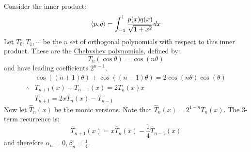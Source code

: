 \documentclass[../Main.tex]{subfiles}
\begin{document}
\begin{example}
    Consider the inner product:
    \begin{equation*}
        \langle p,q\rangle = \int_{-1}^{1} \frac{p(x) q(x)}{\sqrt{1 + x^2}} dx
    \end{equation*}
    Let $T_0, T_1, \cdots$ be the a set of orthogonal polynomials with respect to this inner product. These are the \underline{Chebyshev polynomials}, defined by:
    \begin{equation*}
        T_n(\cos\theta) = \cos(n\theta)
    \end{equation*}
    and have leading coefficients $2^{n-1}$.
    \begin{align*}
        &\cos((n+1)\theta) + \cos((n-1)\theta) = 2\cos(n\theta) \cos(\theta) \\
        \therefore &T_{n+1}(x) + T_{n-1}(x) = 2T_n(x) x \\
        &T_{n+1} = 2x T_n(x) - T_{n-1}
    \end{align*}
    Now let $\hat{T}_n(x)$ be the monic versions. Note that $\hat{T}_n(x) = 2^{1-n} T_n(x)$. The 3-term recurrence is:
    \begin{equation*}
        \hat{T}_{n+1}(x) = x \hat{T}_n(x) - \frac14 \hat{T}_{n-1}(x)
    \end{equation*}
    and therefore $\alpha_n = 0, \beta_n = \frac14$.
\end{example}
\end{document}

